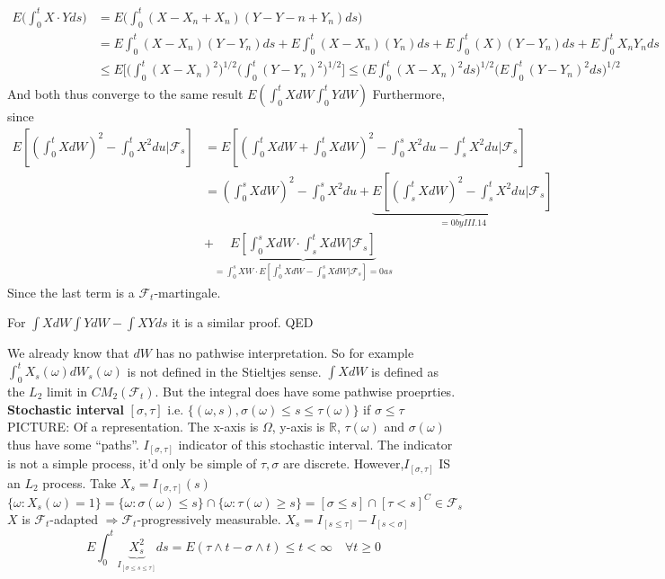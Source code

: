 \documentclass[english]{article}
\newcommand{\R}{\mathbb{R}}
\newcommand{\ub}{\underbrace}
\newcommand{\F}{\mathcal F}
\begin{document}
\begin{align*} E\Big(\int^t_0 X\cdot Y ds \Big) & = E\Big(\int^t_0 (X- X_n + X_n)(Y-Y-n + Y_n) ds \Big)\\
& =E \int^t_0 (X- X_n)(Y - Y_n) ds + E \int^t_0 (X- X_n)( Y_n) ds + E \int^t_0 (X)(Y - Y_n) ds + E \int^t_0 X_n Y_n ds \\
& \leq E\Big[ \Big( \int^t_0 (X-X_n)^2 )^{1/2} \Big( \int^t_0 (Y-Y_n)^2 )^{1/2} \Big] \leq \Big( E \int^t_0 (X-X_n)^2 ds \Big)^{1/2} \Big( E \int^t_0 (Y-Y_n)^2 ds \Big)^{1/2}
\end{align*}
And both thus converge to the same result $E(\int^t_0 X dW \int^t_0 Y dW)$ \newline
Furthermore, since
\begin{align*} E[(\int^t_0 X dW)^2 - \int^t_0 X^2 du | \F_s] & = E[(\int^t_0 X dW + \int^t_0 X dW)^2 - \int^s_0 X^2 du - \int^t_s X^2 du| \F_s] \\
& = (\int^s_0 X dW)^2 - \int^s_0 X^2 du + \ub{E[(\int^t_s X dW)^2 - \int^t_s X^2 du | \F_s]}_{=0 by III.14} \\
&+ \ub{E[\int^s_0 X dW \cdot \int^t_s X dW | \F_s] }_{= \int^s_0 X W \cdot E[\int^t_0 X dW - \int^s_0 X dW | \F_s] = 0 as}
\end{align*}
Since the last term is a $\F_t$-martingale. \newline

For $\int X dW \int Y dW - \int XY ds$ it is a similar proof. QED \newline

We already know that $dW$ has no pathwise interpretation. So for example $\int^t_0 X_s (\omega) dW_s(\omega)$ is not defined in the Stieltjes sense. $\int X dW$ is defined as the $L_2$ limit in $CM_2(\F_t)$. But the integral does have some pathwise proeprties. \newline
\textbf{Stochastic interval} $[\sigma, \tau]$ i.e. $\{(\omega, s), \sigma(\omega) \leq s \leq \tau(\omega) \}$ if $\sigma \leq \tau$ \newline
PICTURE: Of a representation. The x-axis is $\Omega$, y-axis is $\R$, $\tau(\omega)$ and $\sigma(\omega)$ thus have some ``paths''. \newline
$I_{[\sigma, \tau]}$ indicator of this stochastic interval. The indicator is not a simple process, it'd only be simple of $\tau, \sigma$ are discrete. \newline
However,$I_{[\sigma, \tau]}$ IS an $L_2$ process. Take $X_s = I_{[\sigma, \tau]} (s)$
$$\{ \omega: X_s(\omega) = 1 \} = \{\omega : \sigma(\omega) \leq s \} \cap \{ \omega: \tau(\omega) \geq s \} = [\sigma\leq s] \cap [\tau < s]^C \in \F_s$$
$X$ is $\F_t$-adapted $\Rightarrow \F_t$-progressively measurable. $X_s = I_{[s \leq \tau]} - I_{[s < \sigma]}$
$$E\int^t_0 \ub{X_s^2}_{I_{[\sigma \leq s \leq \tau]}} ds = E(\tau\wedge t - \sigma \wedge t) \leq t < \infty \quad \forall t \geq 0$$ \;
\end{document}
